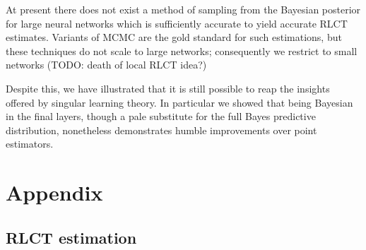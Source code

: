 \documentclass{article} %
\begin{document}
At present there does not exist a method of sampling from the Bayesian posterior for large neural networks which is sufficiently accurate to yield accurate RLCT estimates. Variants of MCMC are the gold standard for such estimations, but these techniques do not scale to large networks; consequently we restrict to small networks (TODO: death of local RLCT idea?)


Despite this, we have  illustrated that it is still possible to reap the insights offered by singular learning theory. In particular we showed that being Bayesian in the final layers, though a pale substitute for the full Bayes predictive distribution, nonetheless demonstrates humble improvements over point estimators. 
%





\appendix
\section{Appendix}

\subsection{RLCT estimation} \label{appendix:RLCT_estimation}

\end{document}
